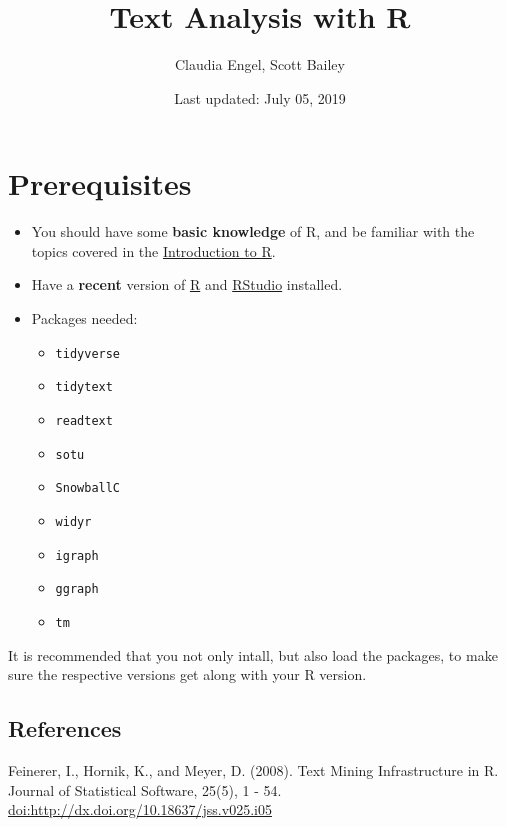 \documentclass[]{book}
\title{Text Analysis with R}
\author{Claudia Engel, Scott Bailey}
\date{Last updated: July 05, 2019}
\providecommand{\tightlist}{%
  \setlength{\itemsep}{0pt}\setlength{\parskip}{0pt}}
\begin{document}
\maketitle

{
\setcounter{tocdepth}{1}
\tableofcontents
}
\hypertarget{prerequisites}{%
\chapter*{Prerequisites}\label{prerequisites}}

\begin{itemize}
\item
  You should have some \textbf{basic knowledge} of R, and be familiar with the topics covered in the \href{https://cengel.github.io/R-intro/}{Introduction to R}.
\item
  Have a \textbf{recent} version of \href{https://cran.r-project.org/}{R} and \href{https://www.rstudio.com/}{RStudio} installed.
\item
  Packages needed:

  \begin{itemize}
  \tightlist
  \item
    \texttt{tidyverse}
  \item
    \texttt{tidytext}
  \item
    \texttt{readtext}
  \item
    \texttt{sotu}
  \item
    \texttt{SnowballC}
  \item
    \texttt{widyr}
  \item
    \texttt{igraph}
  \item
    \texttt{ggraph}
  \item
    \texttt{tm}
  \end{itemize}
\end{itemize}

It is recommended that you not only intall, but also load the packages, to make sure the respective versions get along with your R version.

\hypertarget{references}{%
\section*{References}\label{references}}

Feinerer, I., Hornik, K., and Meyer, D. (2008). Text Mining Infrastructure in R. Journal of Statistical Software, 25(5), 1 - 54. \url{doi:http://dx.doi.org/10.18637/jss.v025.i05}
\end{document}
